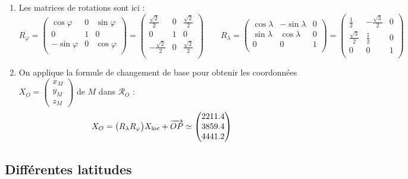 \documentclass[class=report,crop=false]{standalone}
\begin{document}
\begin{exemple}
\begin{enumerate}
  
  \item Les matrices de rotations sont ici :
 $$R_\varphi = 
\begin{pmatrix}
\cos \varphi & 0 & \sin \varphi \\
0            & 1 & 0 \\
-\sin \varphi & 0 & \cos \varphi \\
\end{pmatrix}
=
\begin{pmatrix}
\frac{\sqrt2}{2} & 0 & \frac{\sqrt2}{2} \\
0                & 1 & 0 \\
-\frac{\sqrt2}{2} & 0 & \frac{\sqrt2}{2} \\
\end{pmatrix}
\qquad R_\lambda = 
\begin{pmatrix}
\cos \lambda & -\sin \lambda & 0 \\
\sin \lambda & \cos \lambda  & 0 \\
0            & 0             & 1 \\
\end{pmatrix} = 
\begin{pmatrix}
\frac12          & -\frac{\sqrt3}{2} & 0 \\
\frac{\sqrt3}{2} & \frac12           & 0 \\
0                & 0                 & 1 \\
\end{pmatrix}$$ 
  
  
  \item On applique la formule de changement de base pour obtenir les coordonnées
  $X_O =\left(\begin{smallmatrix}x_M\\y_M\\z_M\end{smallmatrix}\right)$ 
  de $M$ dans $\mathcal{R}_O$ :
  $$X_O =\big(R_\lambda R_\varphi\big) X_{\text{loc}} + \overrightarrow{OP} 
  \simeq \begin{pmatrix}\num{2211.4}\\\num{3859.4}\\\num{4441.2}\end{pmatrix}$$
\end{enumerate}
\end{exemple}


\subsection{Différentes latitudes}
\end{document}
